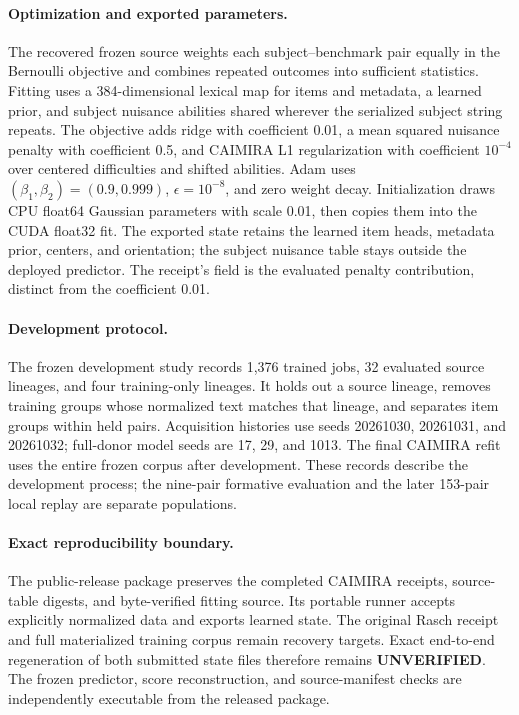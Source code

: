 \paragraph{Optimization and exported parameters.}
The recovered frozen source weights each subject--benchmark pair equally in the Bernoulli objective and combines repeated outcomes into sufficient statistics. Fitting uses a 384-dimensional lexical map for items and metadata, a learned prior, and subject nuisance abilities shared wherever the serialized subject string repeats. The objective adds ridge with coefficient 0.01, a mean squared nuisance penalty with coefficient 0.5, and CAIMIRA L1 regularization with coefficient $10^{-4}$ over centered difficulties and shifted abilities. Adam uses $(\beta_1,\beta_2)=(0.9,0.999)$, $\epsilon=10^{-8}$, and zero weight decay. Initialization draws CPU float64 Gaussian parameters with scale 0.01, then copies them into the CUDA float32 fit. The exported state retains the learned item heads, metadata prior, centers, and orientation; the subject nuisance table stays outside the deployed predictor. The receipt's field  is the evaluated penalty contribution, distinct from the coefficient 0.01.

\paragraph{Development protocol.}
The frozen development study records 1,376 trained jobs, 32 evaluated source lineages, and four training-only lineages. It holds out a source lineage, removes training groups whose normalized text matches that lineage, and separates item groups within held pairs. Acquisition histories use seeds 20261030, 20261031, and 20261032; full-donor model seeds are 17, 29, and 1013. The final CAIMIRA refit uses the entire frozen corpus after development. These records describe the development process; the nine-pair formative evaluation and the later 153-pair local replay are separate populations.

\paragraph{Exact reproducibility boundary.}
The public-release package preserves the completed CAIMIRA receipts, source-table digests, and byte-verified fitting source. Its portable runner accepts explicitly normalized data and exports learned state. The original Rasch receipt and full materialized training corpus remain recovery targets. Exact end-to-end regeneration of both submitted state files therefore remains \textbf{UNVERIFIED}. The frozen predictor, score reconstruction, and source-manifest checks are independently executable from the released package.

